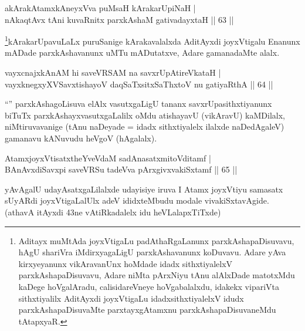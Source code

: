 
\begin{shl}
akArakAtamxkAneyxVva puMsaH kArakarUpiNaH | \\
nAkaqtAvx tAni kuvaRnitx parxkAshaM gativadayxtaH \hfill||  63 ||  
\end{shl}

\begin{artha}
\footnote{Aditayx muMtAda joyxVtigaLu padAthaRgaLanunx parxkAshapaDisuvavu, hAgU shariVra iMdirxyagaLigU parxkAshavanunx koDuvavu. Adare yAva kirxyeyanunx vikAravanUnx hoMdade idadx sithxtiyalelxV parxkAshapaDisuvavu, Adare niMta pArxNiyu tAnu alAlxDade matotxMdu kaDege hoVgalAradu, calisidareVneye hoVgabalalxdu, idakekx vipariVta sithxtiyalilx  AditAyxdi joyxVtigaLu idadxsithxtiyalelxV idudx parxkAshapaDisuvaMte parxtayxgAtamxnu parxkAshapaDisuvaneMdu tAtapxyaR.}kArakarUpavuLaLx puruSanige kArakavalalxda AditAyxdi joyxVtigalu Enanunx mADade parxkAshavanunx uMTu mADutatxve, Adare gamanadaMte alalx.
\end{artha}

 
\begin{shl}
vayxcnajxkAnAM hi saveVRSAM na savxrUpAtireVkataH | \\
vayxknegxyXVSavxtishayoV daqSaTxsitxSaThxtoV nu gatiyaRthA \hfill||  64 ||  
\end{shl}

\begin{artha}
``\stext'' parxkAshagoLisuva elAlx vasutxgaLigU tananx savxrUpasithxtiyanunx biTuTx parxkAshayxvasutxgaLalilx oMdu atishayavU (vikAravU) kaMDilalx, niMtiruvavanige (tAnu naDeyade = idadx sithxtiyalelx ilalxde naDedAgaleV) gamanavu kANuvudu heVgoV (hAgalalx).
\end{artha}

\begin{shl}
AtamxjoyxVtisatxtheYveVdaM sadAnasatxmitoVditamf | \\
BAnAvxdiSavxpi saveVRSu tadeVva pArxgivxvakiSxtamf \hfill||  65 ||  
\end{shl}

\begin{artha}
yAvAgalU udayAsatxgaLilalxde udayisiye iruva I Atamx joyxVtiyu samasatx sUyARdi joyxVtigaLalUlx adeV ididxteMbudu modale vivakiSxtavAgide. (athavA itAyxdi 43ne vAtiRkadalelx idu heVLalapxTiTxde)
\end{artha}


